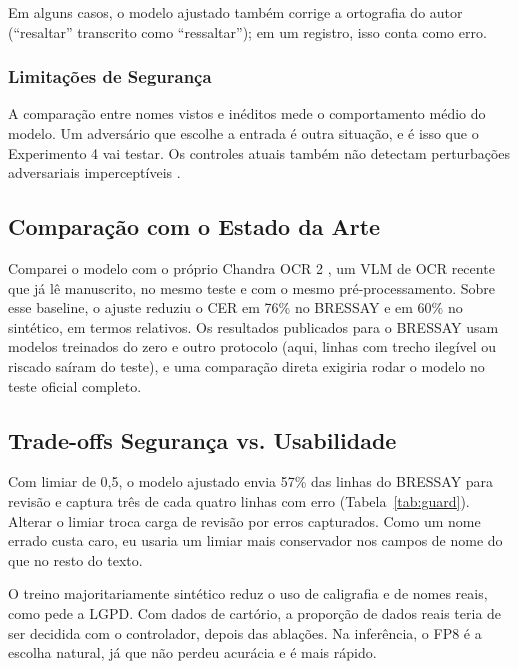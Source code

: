 \documentclass[12pt,a4paper]{article}
\begin{document}
Em alguns casos, o modelo ajustado também corrige a ortografia do autor (``resaltar'' transcrito como ``ressaltar''); em um registro, isso conta como erro.

\subsubsection{Limitações de Segurança}
A comparação entre nomes vistos e inéditos mede o comportamento médio do modelo. Um adversário que escolhe a entrada é outra situação, e é isso que o Experimento 4 vai testar. Os controles atuais também não detectam perturbações adversariais imperceptíveis \cite{goodfellow2014}.

\subsection{Comparação com o Estado da Arte}

Comparei o modelo com o próprio Chandra OCR 2 \cite{chandra2026}, um VLM de OCR recente que já lê manuscrito, no mesmo teste e com o mesmo pré-processamento. Sobre esse baseline, o ajuste reduziu o CER em 76\% no BRESSAY e em 60\% no sintético, em termos relativos. Os resultados publicados para o BRESSAY \cite{bressay2023} usam modelos treinados do zero e outro protocolo (aqui, linhas com trecho ilegível ou riscado saíram do teste), e uma comparação direta exigiria rodar o modelo no teste oficial completo.

\subsection{Trade-offs Segurança vs. Usabilidade}

Com limiar de 0,5, o modelo ajustado envia 57\% das linhas do BRESSAY para revisão e captura três de cada quatro linhas com erro (Tabela~\ref{tab:guard}). Alterar o limiar troca carga de revisão por erros capturados. Como um nome errado custa caro, eu usaria um limiar mais conservador nos campos de nome do que no resto do texto.

O treino majoritariamente sintético reduz o uso de caligrafia e de nomes reais, como pede a LGPD. Com dados de cartório, a proporção de dados reais teria de ser decidida com o controlador, depois das ablações. Na inferência, o FP8 é a escolha natural, já que não perdeu acurácia e é mais rápido.
\end{document}
